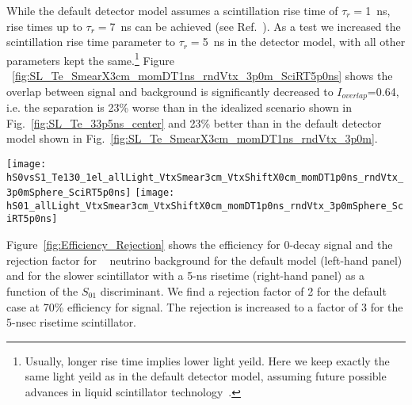 While the default detector model assumes a scintillation rise time of
$\tau_r=$1~ns, rise times up to $\tau_r=$7~ns can be achieved (see
Ref.~\cite{Minfang_slow_rise_time}). As a test we increased the
scintillation rise time parameter to $\tau_r=$5~ns in the detector
model, with all other parameters kept the same.\footnote{Usually,
longer rise time implies lower light yeild. Here we keep exactly
the same light yeild as in the default detector model, assuming future
possible advances in liquid scintillator technology~\cite{Minfang_private}.} 
Figure
~\ref{fig:SL_Te_SmearX3cm_momDT1ns_rndVtx_3p0m_SciRT5p0ns} shows the
overlap between signal and background is significantly decreased to
$I_{overlap}$=0.64, i.e. the separation is 23\% worse than in the
idealized scenario shown in Fig.~\ref{fig:SL_Te_33p5ns_center} and
23\% better than in the default detector model shown in
Fig.~\ref{fig:SL_Te_SmearX3cm_momDT1ns_rndVtx_3p0m}.

\begin{figure*}[h]
  \centering
  \texttt{[image: hS0vsS1\_Te130\_1el\_allLight\_VtxSmear3cm\_VtxShiftX0cm\_momDT1p0ns\_rndVtx\_3p0mSphere\_SciRT5p0ns]} 
  \texttt{[image: hS01\_allLight\_VtxSmear3cm\_VtxShiftX0cm\_momDT1p0ns\_rndVtx\_3p0mSphere\_SciRT5p0ns]}
  \caption{The scintillation rise time constant is increased to
    $\tau_r=$5~ns compared to $\tau_r=$1~ns in the default detector
    model.  \emph{Left:} Scatter plot of $S_0$ versus $S_1$ for a
    simulation of 1000 signal (\emph{red crosses}) and background
    (\emph{blue triangles}) events. Event vertices are uniformly
    distributed within the fiducial volume, $R<3$~m.  Vertex is
    smeared with 5.2~cm resolution. Differential cut of $\Delta
    t=t^{phot}_{measured} - t^{phot}_{predicted}<$1~ns is applied to
    select early PE sample.  The default QE and 100\% photo-coverage
    is used in the simulation.  Black dashed line corresponds to a
    linear fit to define 1-D variable $S_{01}$ (see text for details).
    \emph{Right:} Comparison of the $S_{01}$ distribution between
    signal (\emph{red solid line}) and background (\emph{blue dashed
    line}).  $I_{overlap}$=0.64.}
\label{fig:SL_Te_SmearX3cm_momDT1ns_rndVtx_3p0m_SciRT5p0ns}
\end{figure*}

\clearpage

Figure~\ref{fig:Efficiency_Rejection} shows the
efficiency for 0\nbb-decay signal and the rejection factor for \B~ neutrino
background for the default model (left-hand panel) 
and for the slower scintillator with
a 5-ns risetime (right-hand panel) as a function of the $S_{01}$
discriminant. We find a rejection factor of 2 for the default case at
70\% efficiency for signal. The rejection is increased to a factor of
3 for the 5-nsec risetime scintillator.

